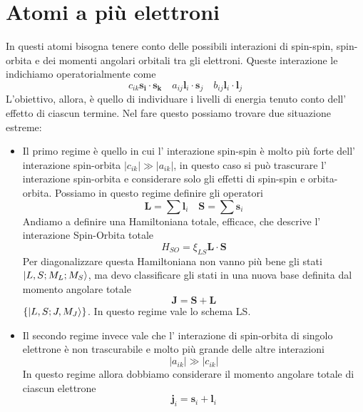 \section{Atomi a più elettroni}
In questi atomi bisogna tenere conto delle possibili interazioni di spin-spin, spin-orbita e dei momenti angolari orbitali tra gli elettroni. Queste interazione le indichiamo operatorialmente come 
\begin{equation*}
  c_{ik} \bm{s_i}\cdot \bm{s_k} \quad a_{ij} \bm{l}_i \cdot\bm{s}_j \quad b_{ij} \bm{l}_i\cdot \bm{l}_j
\end{equation*}
L'obiettivo, allora, è quello di individuare i livelli di energia tenuto conto dell' effetto di ciascun termine. Nel fare questo possiamo trovare due situazione estreme:
\begin{itemize}
  \item Il primo regime è quello in cui l' interazione spin-spin è molto più forte dell' interazione spin-orbita $|c_{ik}|\gg |a_{ik}|$, in questo caso si può trascurare l' interazione spin-orbita e considerare solo gli effetti di spin-spin e orbita-orbita. Possiamo in questo regime definire gli operatori 
    \begin{equation*}
      \bm{L} = \sum \bm{l}_i \quad \bm{S} = \sum \bm{s}_i
    \end{equation*}
    Andiamo a definire una Hamiltoniana totale, efficace, che descrive l' interazione Spin-Orbita totale 
    \begin{equation*}
      H_{SO} = \xi_{LS} \bm{L}\cdot \bm{S}
    \end{equation*}
    Per diagonalizzare questa Hamiltoniana non vanno più bene gli stati $\ket{L,S;M_L;M_S}$, ma devo classificare gli stati in una nuova base definita dal momento angolare totale
    \begin{equation*}
      \bm{J} = \bm{S}+\bm{L}
    \end{equation*}
    $\left\{\ket{L,S;J,M_J}\right\}$. In questo regime vale lo schema LS.
  \item Il secondo regime invece vale che l' interazione di spin-orbita di singolo elettrone è non trascurabile e molto più grande delle altre interazioni
    \begin{equation*}
      |a_{ik}|\gg |c_{ik}|
    \end{equation*}
    In questo regime allora dobbiamo considerare il momento angolare totale di ciascun elettrone
    \begin{equation*}
      \bm{j}_i = \bm{s}_i + \bm{l}_i
    \end{equation*}

\end{itemize}
